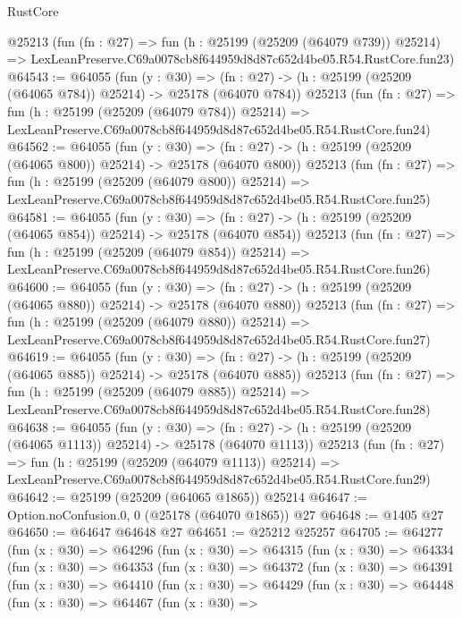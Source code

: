 \begin{lexlean}{RustCore}
\begin{coremodule}
    @25213
    (fun (fn : @27) =>
    fun (h : @25199 (@25209 (@64079 @739)) @25214) =>
    LexLeanPreserve.C69a0078cb8f644959d8d87c652d4be05.R54.RustCore.fun23)
@64543 := @64055
    (fun (y : @30) =>
    (fn : @27) -> (h : @25199 (@25209 (@64065 @784)) @25214) -> @25178 (@64070 @784))
    @25213
    (fun (fn : @27) =>
    fun (h : @25199 (@25209 (@64079 @784)) @25214) =>
    LexLeanPreserve.C69a0078cb8f644959d8d87c652d4be05.R54.RustCore.fun24)
@64562 := @64055
    (fun (y : @30) =>
    (fn : @27) -> (h : @25199 (@25209 (@64065 @800)) @25214) -> @25178 (@64070 @800))
    @25213
    (fun (fn : @27) =>
    fun (h : @25199 (@25209 (@64079 @800)) @25214) =>
    LexLeanPreserve.C69a0078cb8f644959d8d87c652d4be05.R54.RustCore.fun25)
@64581 := @64055
    (fun (y : @30) =>
    (fn : @27) -> (h : @25199 (@25209 (@64065 @854)) @25214) -> @25178 (@64070 @854))
    @25213
    (fun (fn : @27) =>
    fun (h : @25199 (@25209 (@64079 @854)) @25214) =>
    LexLeanPreserve.C69a0078cb8f644959d8d87c652d4be05.R54.RustCore.fun26)
@64600 := @64055
    (fun (y : @30) =>
    (fn : @27) -> (h : @25199 (@25209 (@64065 @880)) @25214) -> @25178 (@64070 @880))
    @25213
    (fun (fn : @27) =>
    fun (h : @25199 (@25209 (@64079 @880)) @25214) =>
    LexLeanPreserve.C69a0078cb8f644959d8d87c652d4be05.R54.RustCore.fun27)
@64619 := @64055
    (fun (y : @30) =>
    (fn : @27) -> (h : @25199 (@25209 (@64065 @885)) @25214) -> @25178 (@64070 @885))
    @25213
    (fun (fn : @27) =>
    fun (h : @25199 (@25209 (@64079 @885)) @25214) =>
    LexLeanPreserve.C69a0078cb8f644959d8d87c652d4be05.R54.RustCore.fun28)
@64638 := @64055
    (fun (y : @30) =>
    (fn : @27) -> (h : @25199 (@25209 (@64065 @1113)) @25214) -> @25178 (@64070 @1113))
    @25213
    (fun (fn : @27) =>
    fun (h : @25199 (@25209 (@64079 @1113)) @25214) =>
    LexLeanPreserve.C69a0078cb8f644959d8d87c652d4be05.R54.RustCore.fun29)
@64642 := @25199 (@25209 (@64065 @1865)) @25214
@64647 := Option.noConfusion.{0, 0} (@25178 (@64070 @1865)) @27
@64648 := @1405 @27
@64650 := @64647 @64648 @27
@64651 := @25212 @25257
@64705 := @64277
    (fun (x : @30) =>
    @64296
      (fun (x : @30) =>
      @64315
        (fun (x : @30) =>
        @64334
          (fun (x : @30) =>
          @64353
            (fun (x : @30) =>
            @64372
              (fun (x : @30) =>
              @64391
                (fun (x : @30) =>
                @64410
                  (fun (x : @30) =>
                  @64429
                    (fun (x : @30) =>
                    @64448
                      (fun (x : @30) =>
                      @64467
                        (fun (x : @30) =>

\end{coremodule}
\end{lexlean}
